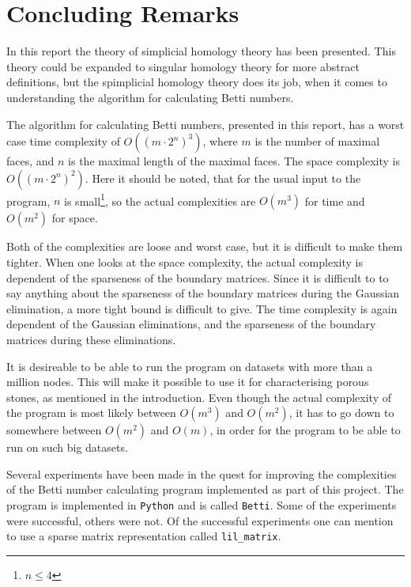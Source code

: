 \documentclass[11pt,a4paper,twoside]{report}
\begin{document}
\chapter{Concluding Remarks}
In this report the theory of simplicial homology theory has been presented. This theory could be expanded to singular homology theory for more abstract definitions, but the spimplicial homology theory does its job, when it comes to understanding the algorithm for calculating Betti numbers.

The algorithm for calculating Betti numbers, presented in this report, has a worst case time complexity of $O((m\cdot 2^n)^3)$, where $m$ is the number of maximal faces, and $n$ is the maximal length of the maximal faces. The space complexity is $O((m\cdot 2^n)^2)$. Here it should be noted, that for the usual input to the program, $n$ is small\footnote{$n\leq 4$}, so the actual complexities are $O(m^3)$ for time and $O(m^2)$ for space. 

Both of the complexities are loose and worst case, but it is difficult to make them tighter. When one looks at the space complexity, the actual complexity is dependent of the sparseness of the boundary matrices. Since it is difficult to to say anything about the sparseness of the boundary matrices during the Gaussian elimination, a more tight bound is difficult to give. The time complexity is again dependent of the Gaussian eliminations, and the sparseness of the boundary matrices during these eliminations. 

It is desireable to be able to run the program on datasets with more than a million nodes. This will make it possible to use it for characterising porous stones, as mentioned in the introduction. Even though the actual complexity of the program is most likely between $O(m^3)$ and $O(m^2)$, it has to go down to somewhere between $O(m^2)$ and $O(m)$, in order for the program to be able to run on such big datasets.

Several experiments have been made in the quest for improving the complexities of the Betti number calculating program implemented as part of this project. The program is implemented in \texttt{Python} and is called \texttt{Betti}. Some of the experiments were successful, others were not. Of the successful experiments one can mention to use a sparse matrix representation called \texttt{lil\_matrix}. 
\end{document}

